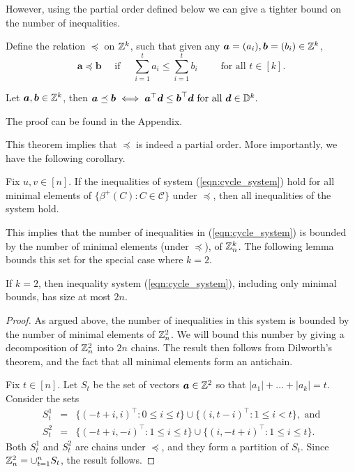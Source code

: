 \documentclass[runningheads]{llncs}
\begin{document}
However, using the partial order defined below we can give a tighter bound on the number of inequalities. 

\begin{definition}\label{def:boundleq}
Define the relation $\preceq$ on $\mathbb Z^k$, such that given any $\boldsymbol a=(a_i), \boldsymbol b=(b_i)\in\mathbb Z^k$,
$$\bm a\preceq \bm b \quad\text{ if }\quad 
\sum_{i=1}^t a_i\leq \sum_{i=1}^tb_i \qquad\text{ for all } t\in[k].$$
\end{definition}

\begin{theorem}\label{thm:bound_equivalence}
Let $\boldsymbol a, \boldsymbol b\in\mathbb Z^k$, then
$\boldsymbol a\preceq \boldsymbol b \iff \boldsymbol a^\top\boldsymbol d\leq \boldsymbol b^\top\boldsymbol d\text{ for all }\boldsymbol d\in\mathbb D^k.$
\end{theorem}

The proof can be found in the Appendix.

This theorem implies that $\preceq$ is indeed a partial order. More importantly, we have the following corollary.

\begin{corollary}
Fix $u,v\in [n]$. If the inequalities of system (\ref{eqn:cycle_system}) hold for all minimal elements of $\{ \beta^+(C): C\in\mathcal{C}\}$  under $\preceq$, then all inequalities of the system hold. 
\end{corollary}

This implies that the number of inequalities in (\ref{eqn:cycle_system}) is bounded by the number of minimal elements (under $\preceq$), of $\mathbb Z^k_n$. The following lemma bounds this set for the special case where $k=2$.

\begin{lemma}\label{lemma:k2minimal}
If $k=2$, then inequality system (\ref{eqn:cycle_system}), including only minimal bounds, has size at most $2n$.
\end{lemma}
\begin{proof}
As argued above, the number of inequalities in this system is bounded by the number of minimal elements of $\mathbb Z^2_n$. We will bound this number by giving a decomposition of $\mathbb Z^2_n $ into $2n$ chains. The result then follows from Dilworth's theorem, and the fact that all minimal elements form an antichain. 

Fix $t\in [n]$. Let $S_t$ be the set of vectors $\boldsymbol a \in\mathbb Z^2$ so that $|a_1|+\dots +|a_k|=t$. Consider the sets 
\begin{eqnarray*}
S_t^1&=&\{(-t+i,i)^\top:0\leq i\leq t\}\cup \{(i,t-i)^\top:1\leq i< t\},\mbox{ and}\\
S_t^2&=&\{(-t+i,-i)^\top:1\leq i\leq t\}\cup \{(i,-t+i)^\top:1\leq i\leq t\}.
\end{eqnarray*}
Both $S_t^1$ and $S_t^2$ are chains under $\preceq$, and they form a partition of $S_t$. Since $\mathbb Z_n^2=\cup_{t=1}^n S_t$, the result follows.
\end{proof}
\end{document}
